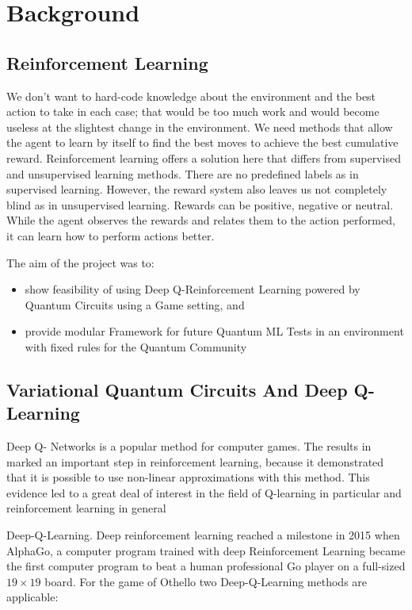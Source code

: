 \documentclass[conference]{IEEEtran}
\begin{document}
\section{Background}

\subsection{Reinforcement Learning}

We don't want to hard-code knowledge about the environment and the best action to take in each case; that would be too much work and would become useless at the slightest change in the environment. We need methods that allow the agent to learn by itself to find the best moves to achieve the best cumulative reward.
Reinforcement learning offers a solution here that differs from supervised and unsupervised learning methods. There are no predefined labels as in supervised learning. However, the reward system also leaves us not completely blind as in unsupervised learning. Rewards can be positive, negative or neutral. While the agent observes the rewards and relates them to the action performed, it can learn how to perform actions better.


The aim of the project was to:
\begin{itemize} 
	\item show feasibility of using Deep Q-Reinforcement Learning powered by Quantum Circuits using a Game setting, and
	\item provide modular Framework for future Quantum ML Tests in an environment with fixed rules for the Quantum Community
\end{itemize}

\subsection{Variational Quantum Circuits And Deep Q-Learning}
Deep Q- Networks is a popular method for computer games. The results in \cite{nature}  marked an important step in reinforcement learning, because it demonstrated that it is possible to use non-linear approximations with this method. This evidence led to a great deal of interest in the field of Q-learning in particular and reinforcement learning in general 

Deep-Q-Learning. Deep reinforcement learning reached a milestone in 2015 when AlphaGo, a computer program trained with deep Reinforcement Learning became the first computer program to beat a human professional Go player on a full-sized $19\times19$ board.
For the game of Othello two Deep-Q-Learning methods are applicable:
\end{document}
